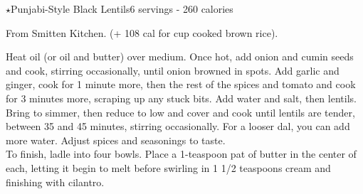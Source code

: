 \begin{recipe}{$\star$Punjabi-Style Black Lentils}{6 servings - 260 calories}{}

\freeform From Smitten Kitchen. (+ 108 cal for  cup cooked brown rice).


Heat oil (or oil and butter) over medium. Once hot, add onion and cumin seeds and cook, stirring occasionally, until onion browned in spots. Add garlic and ginger, cook for 1 minute more, then the rest of the spices and tomato and cook for 3 minutes more, scraping up any stuck bits. Add water and salt, then lentils. Bring to simmer, then reduce to low and cover and cook until lentils are tender, between 35 and 45 minutes, stirring occasionally. For a looser dal, you can add more water. Adjust spices and seasonings to taste.\\

To finish, ladle into four bowls. Place a 1-teaspoon pat of butter in the center of each, letting it begin to melt before swirling in 1 1/2 teaspoons cream and finishing with cilantro.


\end{recipe}